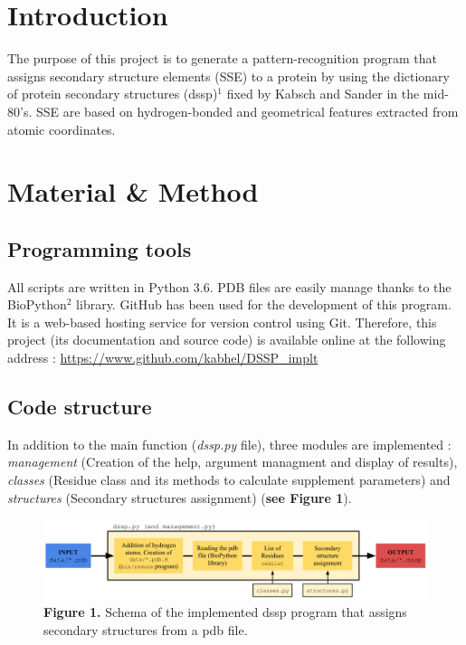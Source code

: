 \documentclass[12pt]{article}
\begin{document}
\maketitle

\section{Introduction}
The purpose of this project is to generate a pattern-recognition program that assigns secondary structure elements (SSE) to a protein by using the dictionary of protein secondary structures (dssp)$^1$ fixed by Kabsch and Sander in the mid-80's. SSE are based on hydrogen-bonded and geometrical features extracted from atomic coordinates.

\section{Material \& Method}
\subsection{Programming tools}
All scripts are written in Python 3.6. PDB files are easily manage thanks to the BioPython$^2$ library. GitHub has been used for the development of this program. It is a web-based hosting service for version control using Git. Therefore, this project (its documentation and source code) is available online at the following address :  \url{https://www.github.com/kabhel/DSSP\_implt} 

\subsection{Code structure}
In addition to the main function (\textit{dssp.py} file), three modules are implemented : \textit{management} (Creation of the help, argument managment and display of results), \textit{classes} (Residue class and its methods to calculate supplement parameters) and \textit{structures} (Secondary structures assignment) (\textbf{see Figure 1}).
\begin{figure}[h!]
	\centering
	\includegraphics[totalheight=3.5cm]{img/dssp_prog_schema.png}
	\label{fig:verticalcell}
\footnotesize\textbf{Figure 1.} Schema of the implemented dssp program that assigns secondary structures from a pdb file.
\end{figure}
\end{document}
